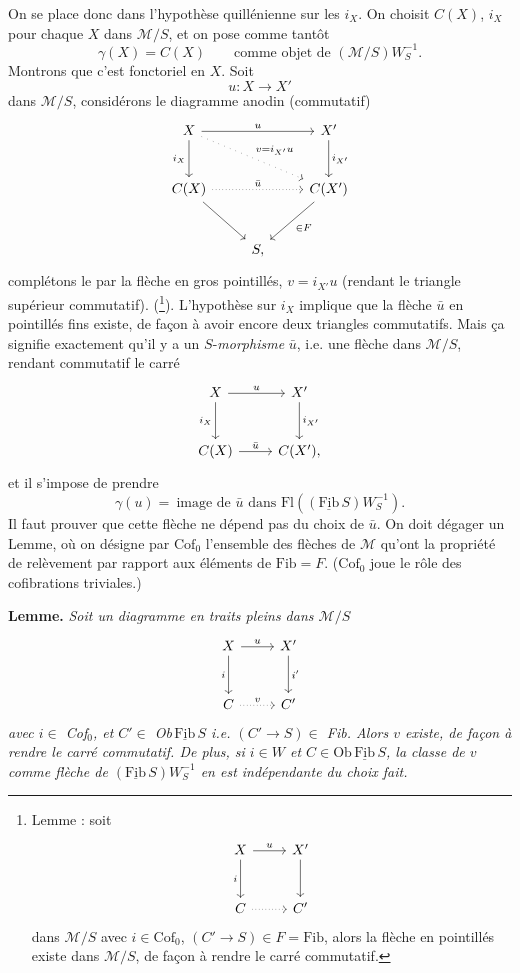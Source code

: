 \documentclass[11pt]{article}
\newcommand{\printedpage}[1]{\marginpar{\footnotesize p.~#1}}
\newcommand{\msp}[1]{\marginpar{\footnotesize [#1]}}
\newcommand{\Ob}{\mathrm{Ob}}
\newcommand{\Fl}{\mathrm{Fl}}
\newcommand{\cM}{\mathcal{M}}
\newcommand{\Fib}{\underline{\mathrm{Fib}}\,}
\begin{document}
\msp{page 90}On se place donc dans l'hypothèse quillénienne sur les $i_X$. On choisit $C(X)$, $i_X$ pour
chaque $X$ dans $\cM/S$, et on pose comme tantôt
\[
\gamma(X)=C(X) \qquad \text{comme objet de $(\cM/S)W_S^{-1}$.}
\]
Montrons que c'est fonctoriel en $X$. Soit
\[
u:X\longrightarrow X'
\]
dans $\cM/S$, considérons le diagramme anodin (commutatif)
\[
\begin{tikzcd}[row sep=large]
X \arrow[rr, "u"] \arrow[d, "i_X"'] \arrow[drr, loosely dotted, "v=i_{X'}u"] & & X' \arrow[d, "i_{X'}"] \\
C(X) \arrow[rr, dotted, "\bar{u}"] \arrow[dr] & & C(X') \arrow[dl, "\in F"] \\
& S, &
\end{tikzcd}
\]
complétons le par la flèche en gros pointillés, $v=i_{X'}u$ (rendant le triangle supérieur
commutatif). (\footnote[54]{Lemme : soit
\[
\begin{tikzcd}[ampersand replacement=\&, row sep=large]
X \arrow[r, "u"] \arrow[d, "i"'] \& X' \arrow[d] \\
C \arrow[r, dotted] \& C'
\end{tikzcd}
\]
dans $\cM/S$ avec $i\in\mathrm{Cof}_0$, $(C'\longrightarrow S)\in F=\mathrm{Fib}$, alors la flèche en pointillés existe dans $\cM/S$, de façon
à rendre le carré commutatif.}). L'hypothèse sur $i_X$ implique que la flèche $\bar{u}$ en pointillés fins existe,
de façon à avoir encore deux triangles commutatifs. Mais ça signifie exactement qu'il y a
un $S$-\textit{morphisme} $\bar{u}$, i.e. une flèche dans $\cM/S$, rendant commutatif le carré
\printedpage{57}
\[
\begin{tikzcd}[row sep=large]
X \arrow[r, "u"] \arrow[d, "i_X"'] & X' \arrow[d, "i_{X'}"] \\
C(X) \arrow[r, "\bar{u}"] & C(X'),
\end{tikzcd}
\]
\msp{page 91}et il s'impose de prendre
\[
\gamma(u)=\ \text{image de $\bar{u}$ dans $\Fl((\Fib S)W_S^{-1})$.}
\]
Il faut prouver que cette flèche ne dépend pas du choix de $\bar{u}$. On doit dégager un Lemme,
où on désigne par $\mathrm{Cof}_0$ l'ensemble des flèches de $\cM$ qu'ont %
la propriété de relèvement par
rapport aux éléments de $\mathrm{Fib}=F$. ($\mathrm{Cof}_0$ joue le rôle des cofibrations triviales.)

\textbf{Lemme.} \textit{Soit un diagramme en traits pleins dans $\cM/S$}
\[
\begin{tikzcd}[row sep=large]
X \arrow[r, "u"] \arrow[d, "i"'] & X' \arrow[d, "i'"] \\
C \arrow[r, dotted, "v"] & C'
\end{tikzcd}
\]
\textit{avec $i\in$ Cof$_0$, et $C'\in$ Ob$\,\Fib S$ i.e. $(C'\longrightarrow S)\in$ Fib. Alors $v$ existe, de façon à rendre
le carré commutatif. De plus, si $i\in W$ et $C\in\Ob\,\Fib S$, la classe de $v$ comme flèche de
$(\Fib S)W_S^{-1}$ en est indépendante du choix fait.}
\end{document}
